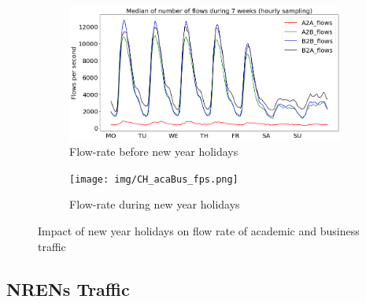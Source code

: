 \documentclass[10pt, journal, letterpaper]{IEEEtran}
\newcommand\linearFigSze{0.48}
\begin{document}
\begin{figure}
    \begin{subfigure}{\linearFigSze\textwidth}
          \centering
          \includegraphics[width=\columnwidth]{img/BCH_acaBus_fps.png}
          \caption{Flow-rate before new year holidays}
          \label{fig:BCH_acaBus_fps}
    \end{subfigure}
    \begin{subfigure}{\linearFigSze\textwidth}
          \centering
          \texttt{[image: img/CH\_acaBus\_fps.png]}
          \caption{Flow-rate during new year holidays}
          \label{fig:CH_acaBus_fps}
    \end{subfigure}
    \caption{Impact of new year holidays on flow rate of academic and business traffic}
    \label{fig:flowrate_acaBus_BCH_CH}
\end{figure}

\subsection{NRENs Traffic}
\end{document}
